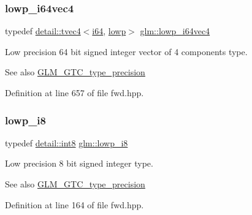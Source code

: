\subsubsection{\texorpdfstring{lowp\+\_\+i64vec4}{lowp\_i64vec4}}
{\footnotesize\ttfamily typedef \hyperlink{structglm_1_1detail_1_1tvec4}{detail\+::tvec4}$<$\hyperlink{group__gtc__type__precision_gac7a7eaad46064fc952b06df33689da23}{i64}, \hyperlink{namespaceglm_a0f04f086094c747d227af4425893f545ae161af3fc695e696ce3bf69f7332bc2d}{lowp}$>$ \hyperlink{group__gtc__type__precision_ga95c13b9d4f94d1783e7d96534d1651d8}{glm\+::lowp\+\_\+i64vec4}}

Low precision 64 bit signed integer vector of 4 components type. \begin{DoxySeeAlso}{See also}
\hyperlink{group__gtc__type__precision}{G\+L\+M\+\_\+\+G\+T\+C\+\_\+type\+\_\+precision} 
\end{DoxySeeAlso}


Definition at line 657 of file fwd.\+hpp.

\mbox{\label{group__gtc__type__precision_gaa2e13ee29c90f75658beed6082541097}} 
\subsubsection{\texorpdfstring{lowp\+\_\+i8}{lowp\_i8}}
{\footnotesize\ttfamily typedef \hyperlink{namespaceglm_1_1detail_a04b526a8d7a9b455602a0afa78c531e0}{detail\+::int8} \hyperlink{group__gtc__type__precision_gaa2e13ee29c90f75658beed6082541097}{glm\+::lowp\+\_\+i8}}

Low precision 8 bit signed integer type. \begin{DoxySeeAlso}{See also}
\hyperlink{group__gtc__type__precision}{G\+L\+M\+\_\+\+G\+T\+C\+\_\+type\+\_\+precision} 
\end{DoxySeeAlso}


Definition at line 164 of file fwd.\+hpp.

\mbox{\label{group__gtc__type__precision_ga490ff77964d0386c1db936eb2a324988}} 
